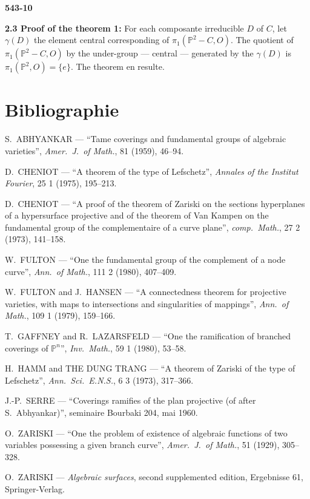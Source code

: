 \documentclass[12pt,a4paper]{article}
\begin{document}
\newpage
\begin{flushright}
\textbf{543-10}
\end{flushright}

\textbf{2.3 Proof of the theorem 1:} For each composante irreducible $D$ of $C$, let $\gamma(D)$ the element central corresponding of $\pi_1(\mathbb{P}^2 - C, O)$. The quotient of $\pi_1(\mathbb{P}^2 - C, O)$ by the under-group --- central --- generated by the $\gamma(D)$ is $\pi_1(\mathbb{P}^2, O) = \{e\}$. The theorem en resulte.

\section*{Bibliographie}

\begin{enumerate}[label={[\arabic*]}]
\item S.\ ABHYANKAR --- ``Tame coverings and fundamental groups of algebraic varieties'', \textit{Amer.\ J.\ of Math.}, 81 (1959), 46--94.
\item D.\ CHENIOT --- ``A theorem of the type of Lefschetz'', \textit{Annales of the Institut Fourier}, 25 1 (1975), 195--213.
\item[{$[2$ bis$]$}] D.\ CHENIOT --- ``A proof of the theorem of Zariski on the sections hyperplanes of a hypersurface projective and of the theorem of Van Kampen on the fundamental group of the complementaire of a curve plane'', \textit{comp.\ Math.}, 27 2 (1973), 141--158.
\item W.\ FULTON --- ``One the fundamental group of the complement of a node curve'', \textit{Ann.\ of Math.}, 111 2 (1980), 407--409.
\item W.\ FULTON and J.\ HANSEN --- ``A connectedness theorem for projective varieties, with maps to intersections and singularities of mappings'', \textit{Ann.\ of Math.}, 109 1 (1979), 159--166.
\item T.\ GAFFNEY and R.\ LAZARSFELD --- ``One the ramification of branched coverings of $\mathbb{P}^n$'', \textit{Inv.\ Math.}, 59 1 (1980), 53--58.
\item H.\ HAMM and THE DUNG TRANG --- ``A theorem of Zariski of the type of Lefschetz'', \textit{Ann.\ Sci.\ E.N.S.}, 6 3 (1973), 317--366.
\item J.-P.\ SERRE --- ``Coverings ramifies of the plan projective (of after S.\ Abhyankar)'', seminaire Bourbaki 204, mai 1960.
\item O.\ ZARISKI --- ``One the problem of existence of algebraic functions of two variables possessing a given branch curve'', \textit{Amer.\ J.\ of Math.}, 51 (1929), 305--328.
\item[{$[9]$}] O.\ ZARISKI --- \textit{Algebraic surfaces}, second supplemented edition, Ergebnisse 61, Springer-Verlag.
\end{enumerate}
\end{document}
